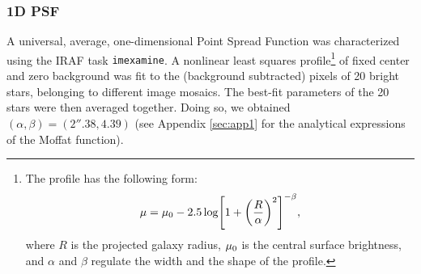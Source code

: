 \documentclass[preprint2]{emulateapj}
\begin{document}
\subsubsection{1D PSF}
A universal, average, one-dimensional Point Spread Function was characterized using the IRAF task {\tt imexamine}.
A nonlinear least squares \citep{moffat1969} profile\footnote{The \citep{moffat1969} profile 
has the following form:
\begin{equation}
\mu = \mu_{\rm 0} - 2.5 \log \Biggl[ 1 + \biggl( \frac{R}{\alpha} \biggr)^2 \Biggr]^{-\beta} ,
\end{equation}
where $R$ is the projected galaxy radius, $\mu_{\rm 0}$ is the central surface brightness, and 
$\alpha$ and $\beta$ regulate the width and the shape of the profile.} 
of fixed center and zero background was fit to the 
(background subtracted) pixels of 20 bright stars, belonging to different image mosaics.
The best-fit parameters of the 20 stars were then averaged together. 
Doing so, we obtained %
$(\alpha, \beta) = (2''.38, 4.39)$ %
(see Appendix \ref{sec:app1} for the analytical expressions of the Moffat function).
\end{document}
